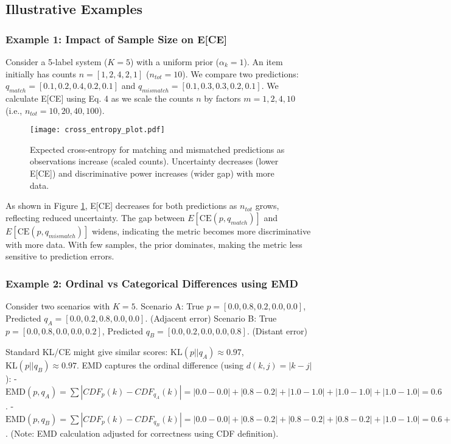 \documentclass[journal]{IEEEtran}
\begin{document}
\subsection{Illustrative Examples}

\subsubsection{Example 1: Impact of Sample Size on E[CE]}
Consider a 5-label system ($K=5$) with a uniform prior ($\alpha_k=1$). An item initially has counts $n = [1, 2, 4, 2, 1]$ ($n_{tot}=10$). We compare two predictions: $q_{match} = [0.1, 0.2, 0.4, 0.2, 0.1]$ and $q_{mismatch} = [0.1, 0.3, 0.3, 0.2, 0.1]$. We calculate E[CE] using Eq. 4 as we scale the counts $n$ by factors $m=1, 2, 4, 10$ (i.e., $n_{tot}=10, 20, 40, 100$).

\begin{figure}[t]
\centering
\texttt{[image: cross\_entropy\_plot.pdf]} %
\caption{Expected cross-entropy for matching and mismatched predictions as observations increase (scaled counts). Uncertainty decreases (lower E[CE]) and discriminative power increases (wider gap) with more data.}
\label{fig:cross_entropy}
\end{figure}

As shown in Figure \ref{fig:cross_entropy}, E[CE] decreases for both predictions as $n_{tot}$ grows, reflecting reduced uncertainty. The gap between $E[\text{CE}(p, q_{match})]$ and $E[\text{CE}(p, q_{mismatch})]$ widens, indicating the metric becomes more discriminative with more data. With few samples, the prior dominates, making the metric less sensitive to prediction errors.

\subsubsection{Example 2: Ordinal vs Categorical Differences using EMD}
Consider two scenarios with $K=5$.
Scenario A: True $p=[0.0, 0.8, 0.2, 0.0, 0.0]$, Predicted $q_A=[0.0, 0.2, 0.8, 0.0, 0.0]$. (Adjacent error)
Scenario B: True $p=[0.0, 0.8, 0.0, 0.0, 0.2]$, Predicted $q_B=[0.0, 0.2, 0.0, 0.0, 0.8]$. (Distant error)

Standard KL/CE might give similar scores: $\text{KL}(p||q_A) \approx 0.97$, $\text{KL}(p||q_B) \approx 0.97$.
EMD captures the ordinal difference (using $d(k,j)=|k-j|$):
- $\text{EMD}(p, q_A) = \sum |CDF_p(k) - CDF_{q_A}(k)| = |0.0-0.0| + |0.8-0.2| + |1.0-1.0| + |1.0-1.0| + |1.0-1.0| = 0.6$.
- $\text{EMD}(p, q_B) = \sum |CDF_p(k) - CDF_{q_B}(k)| = |0.0-0.0| + |0.8-0.2| + |0.8-0.2| + |0.8-0.2| + |1.0-1.0| = 0.6 + 0.6 + 0.6 + 0 = 1.8$.
(Note: EMD calculation adjusted for correctness using CDF definition).
\end{document}
